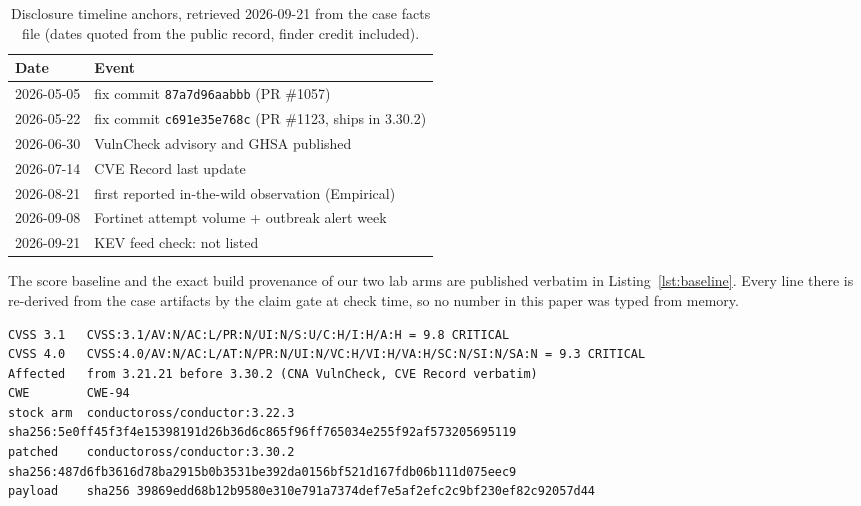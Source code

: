 \documentclass[journal]{IEEEtran}
\begin{document}
\begin{table}[t]
\centering
\caption{Disclosure timeline anchors, retrieved 2026-09-21 from the case facts
file (dates quoted from the public record, finder credit included).}
\label{tab:timeline}
\footnotesize
\begin{tabular}{@{}p{2.35cm}p{5.55cm}@{}}
\toprule
Date & Event \\
\midrule
2026-05-05 & fix commit \texttt{87a7d96aabbb} (PR \#1057) \\
2026-05-22 & fix commit \texttt{c691e35e768c} (PR \#1123, ships in 3.30.2) \\
2026-06-30 & VulnCheck advisory and GHSA published \\
2026-07-14 & CVE Record last update \\
2026-08-21 & first reported in-the-wild observation (Empirical) \\
2026-09-08 & Fortinet attempt volume + outbreak alert week \\
2026-09-21 & KEV feed check: not listed \\
\bottomrule
\end{tabular}
\end{table}

The score baseline and the exact build provenance of our two lab arms are
published verbatim in Listing~\ref{lst:baseline}. Every line there is
re-derived from the case artifacts by the claim gate at check time, so no
number in this paper was typed from memory.

\begin{table}[t]
\centering
\begin{minipage}{0.96\textwidth}
\begin{lstlisting}[style=facts,caption={Gate-derived value baseline: case facts (quoted verbatim from the
case facts file, digests cross-checked against registry digests at lab build
time) and the frozen A/B payload digest (from the A/B evidence file). Claim
ids live in the source comments of this file.},
label={lst:baseline}]
CVSS 3.1   CVSS:3.1/AV:N/AC:L/PR:N/UI:N/S:U/C:H/I:H/A:H = 9.8 CRITICAL
CVSS 4.0   CVSS:4.0/AV:N/AC:L/AT:N/PR:N/UI:N/VC:H/VI:H/VA:H/SC:N/SI:N/SA:N = 9.3 CRITICAL
Affected   from 3.21.21 before 3.30.2 (CNA VulnCheck, CVE Record verbatim)
CWE        CWE-94
stock arm  conductoross/conductor:3.22.3
sha256:5e0ff45f3f4e15398191d26b36d6c865f96ff765034e255f92af573205695119
patched    conductoross/conductor:3.30.2
sha256:487d6fb3616d78ba2915b0b3531be392da0156bf521d167fdb06b111d075eec9
payload    sha256 39869edd68b12b9580e310e791a7374def7e5af2efc2c9bf230ef82c92057d44
\end{lstlisting}
\end{minipage}
\end{table}
\end{document}
